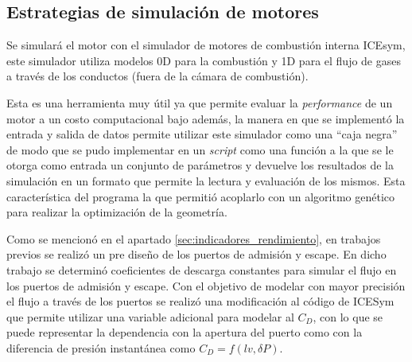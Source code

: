 



\subsection{Estrategias de simulación de motores}
%
Se simulará el motor con el simulador de motores de combustión interna ICEsym,
este simulador utiliza modelos 0D para la combustión y 1D para el flujo de
gases a través de los conductos (fuera de la cámara de combustión).

Esta es una herramienta muy útil ya que permite evaluar la \emph{performance} de
un motor a un costo computacional bajo además, la manera en que se implementó la
entrada y salida de datos permite utilizar este simulador como una ``caja
negra'' de modo que se pudo implementar en un \emph{script} como una función a
la que se le otorga como entrada un conjunto de parámetros y devuelve los
resultados de la simulación en un formato que permite la lectura y evaluación de
los mismos.
%
Esta característica del programa la que permitió acoplarlo con un algoritmo
genético para realizar la optimización de la geometría.


Como se mencionó en el apartado \ref{sec:indicadores_rendimiento}, en trabajos
previos se realizó un pre diseño de los puertos de admisión y escape.
%
En dicho trabajo se determinó coeficientes de descarga constantes
para simular el flujo en los puertos de admisión y escape.
%
Con el objetivo de modelar con mayor precisión el flujo a través de los puertos
se realizó una modificación al código de ICESym que permite utilizar una
variable adicional para modelar al $C_D$, con lo que se puede representar la
dependencia con la apertura del puerto como con la diferencia de presión
instantánea como $C_D = f(lv, \delta P)$.
